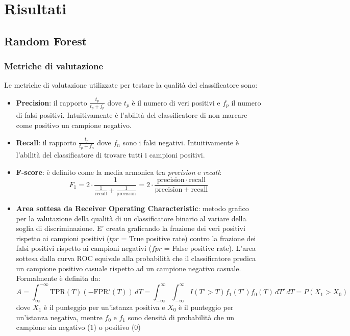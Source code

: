 
\chapter{Risultati}
\label{risultati}

\section{Random Forest}

\subsection{Metriche di valutazione}
Le metriche di valutazione utilizzate per testare la qualità del classificatore sono:
\begin{itemize}
\item \textbf{Precision}: il rapporto $\frac{t_p}{t_p+f_p}$ dove $t_p$ è il numero di veri positivi e $f_p$ il numero di falsi positivi. Intuitivamente è l'abilità del classificatore di non marcare come positivo un campione negativo.
\item \textbf{Recall}: il rapporto $\frac{t_p}{t_p+f_n}$  dove $f_n$ sono i falsi negativi. Intuitivamente è l'abilità del classificatore di trovare tutti i campioni positivi.
\item \textbf{F-score}: è definito come la media armonica tra \textit{precision} e \textit{recall}: 
\[F_1 = 2 \cdot \frac{1}{\tfrac{1}{\mathrm{recall}} + \tfrac{1}{\mathrm{precision}}} = 2 \cdot \frac{\mathrm{precision} \cdot \mathrm{recall}}{\mathrm{precision} + \mathrm{recall}}\]
\item \textbf{Area sottesa da Receiver Operating Characteristic}:  metodo grafico per la valutazione della qualità di un classificatore binario al variare della soglia di discriminazione. E' creata graficando la frazione dei veri positivi rispetto ai campioni positivi ($tpr$ = True positive rate) contro la frazione dei falsi positivi rispetto ai campioni negativi ($fpr$ = False positive rate). L'area sottesa dalla curva ROC equivale alla probabilità che il classificatore predica un campione positivo casuale rispetto ad un campione negativo casuale. Formalmente è definita da:
\[ A = \int_{\infty}^{-\infty} \mbox{TPR}(T) \left(-\mbox{FPR}'(T)\right) \, dT = \int_{-\infty}^{\infty} \int_{-\infty}^{\infty} I(T'>T)f_1(T') f_0(T) \, dT' \, dT = P(X_1 > X_0)\]
dove 
$X_{1}$ è il punteggio per un'istanza positiva e $X_{0}$ è il punteggio per un'istanza negativa, mentre $f_{0}$ e $f_{1}$ sono densità di probabilità che un campione sia negativo ($1$) o positivo ($0$)
\end{itemize}
